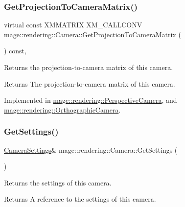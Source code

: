 \subsubsection{\texorpdfstring{Get\+Projection\+To\+Camera\+Matrix()}{GetProjectionToCameraMatrix()}}
{\footnotesize\ttfamily virtual const X\+M\+M\+A\+T\+R\+IX X\+M\+\_\+\+C\+A\+L\+L\+C\+O\+NV mage\+::rendering\+::\+Camera\+::\+Get\+Projection\+To\+Camera\+Matrix (\begin{DoxyParamCaption}{ }\end{DoxyParamCaption}) const\hspace{0.3cm}{\ttfamily [pure virtual]}, {\ttfamily [noexcept]}}

Returns the projection-\/to-\/camera matrix of this camera.

\begin{DoxyReturn}{Returns}
The projection-\/to-\/camera matrix of this camera. 
\end{DoxyReturn}


Implemented in \hyperlink{classmage_1_1rendering_1_1_perspective_camera_af049c6330ebdaa822bfd31dc88f25ac2}{mage\+::rendering\+::\+Perspective\+Camera}, and \hyperlink{classmage_1_1rendering_1_1_orthographic_camera_a7d52862a3762dcaeadf26e8ae92d9d09}{mage\+::rendering\+::\+Orthographic\+Camera}.

\hypertarget{classmage_1_1rendering_1_1_camera_a32588a00052469be808d2819953ea2a4}{}\label{classmage_1_1rendering_1_1_camera_a32588a00052469be808d2819953ea2a4} 
\subsubsection{\texorpdfstring{Get\+Settings()}{GetSettings()}\hspace{0.1cm}{\footnotesize\ttfamily [1/2]}}
{\footnotesize\ttfamily \hyperlink{classmage_1_1rendering_1_1_camera_settings}{Camera\+Settings}\& mage\+::rendering\+::\+Camera\+::\+Get\+Settings (\begin{DoxyParamCaption}{ }\end{DoxyParamCaption})\hspace{0.3cm}{\ttfamily [noexcept]}}

Returns the settings of this camera.

\begin{DoxyReturn}{Returns}
A reference to the settings of this camera. 
\end{DoxyReturn}
\hypertarget{classmage_1_1rendering_1_1_camera_a65d79baabdaaf9847102a03f6965e0ed}{}\label{classmage_1_1rendering_1_1_camera_a65d79baabdaaf9847102a03f6965e0ed} 
